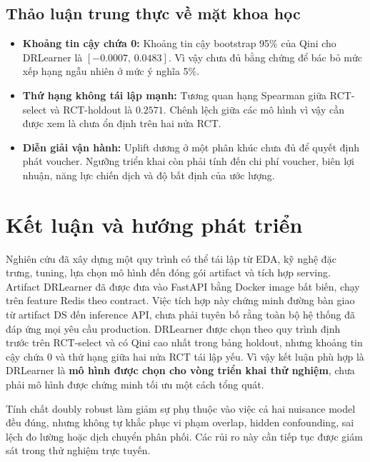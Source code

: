 \documentclass[11pt,a4paper]{article}
\DeclareRobustCommand{\code}[1]{{\small\texttt{#1}}}
\def\code#1{#1}%
\begin{document}
\subsection{Thảo luận trung thực về mặt khoa học}
\begin{itemize}
    \item \textbf{Khoảng tin cậy chứa 0:} Khoảng tin cậy bootstrap 95\% của
    Qini cho DRLearner là $[-0.0007,\,0.0483]$. Vì vậy chưa đủ bằng chứng để
    bác bỏ mức xếp hạng ngẫu nhiên ở mức ý nghĩa 5\%.
    \item \textbf{Thứ hạng không tái lập mạnh:} Tương quan hạng Spearman
    giữa \code{RCT-select} và \code{RCT-holdout} là $0.2571$. Chênh lệch
    giữa các mô hình vì vậy cần được xem là chưa ổn định trên hai nửa RCT.
    \item \textbf{Diễn giải vận hành:} Uplift dương ở một phân khúc chưa đủ
    để quyết định phát voucher. Ngưỡng triển khai còn phải tính đến chi phí
    voucher, biên lợi nhuận, năng lực chiến dịch và độ bất định của ước lượng.
\end{itemize}

\section{Kết luận và hướng phát triển}

Nghiên cứu đã xây dựng một quy trình có thể tái lập từ EDA, kỹ nghệ đặc
trưng, tuning, lựa chọn mô hình đến đóng gói artifact và tích hợp serving.
Artifact DRLearner đã được đưa vào FastAPI bằng Docker image bất biến, chạy
trên feature Redis theo contract. Việc tích hợp này chứng minh đường bàn giao
từ artifact DS đến inference API, chưa phải tuyên bố rằng toàn bộ hệ thống đã
đáp ứng mọi yêu cầu production. DRLearner được chọn theo quy trình định trước
trên RCT-select và có
Qini cao nhất trong bảng holdout, nhưng khoảng tin cậy chứa 0 và thứ hạng giữa
hai nửa RCT tái lập yếu. Vì vậy kết luận phù hợp là DRLearner là
\textbf{mô hình được chọn cho vòng triển khai thử nghiệm}, chưa phải mô hình
được chứng minh tối ưu một cách tổng quát.

Tính chất doubly robust làm giảm sự phụ thuộc vào việc cả hai nuisance model
đều đúng, nhưng không tự khắc phục vi phạm overlap, hidden confounding, sai
lệch đo lường hoặc dịch chuyển phân phối. Các rủi ro này cần tiếp tục được
giám sát trong thử nghiệm trực tuyến.
\end{document}
